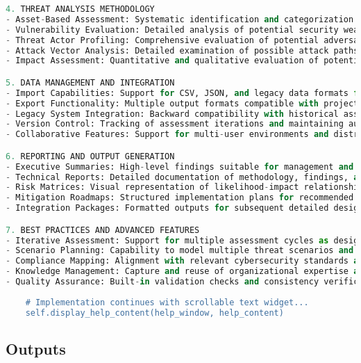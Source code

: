 \documentclass[binding=0.6cm]{sapthesis}
\begin{document}
\begin{lstlisting}[language=Python, caption=Phase 0/A Tool Enhanced Interface Layout]
4. THREAT ANALYSIS METHODOLOGY
- Asset-Based Assessment: Systematic identification and categorization of all mission-critical assets
- Vulnerability Evaluation: Detailed analysis of potential security weaknesses in system design
- Threat Actor Profiling: Comprehensive evaluation of potential adversaries and their capabilities
- Attack Vector Analysis: Detailed examination of possible attack paths and exploitation scenarios
- Impact Assessment: Quantitative and qualitative evaluation of potential consequences

5. DATA MANAGEMENT AND INTEGRATION
- Import Capabilities: Support for CSV, JSON, and legacy data formats from previous assessments
- Export Functionality: Multiple output formats compatible with project management and reporting systems
- Legacy System Integration: Backward compatibility with historical assessment methodologies
- Version Control: Tracking of assessment iterations and maintaining audit trails
- Collaborative Features: Support for multi-user environments and distributed assessment teams

6. REPORTING AND OUTPUT GENERATION
- Executive Summaries: High-level findings suitable for management and stakeholder communication
- Technical Reports: Detailed documentation of methodology, findings, and technical recommendations
- Risk Matrices: Visual representation of likelihood-impact relationships for identified risks
- Mitigation Roadmaps: Structured implementation plans for recommended security controls
- Integration Packages: Formatted outputs for subsequent detailed design phase assessments

7. BEST PRACTICES AND ADVANCED FEATURES
- Iterative Assessment: Support for multiple assessment cycles as design evolves
- Scenario Planning: Capability to model multiple threat scenarios and operational conditions
- Compliance Mapping: Alignment with relevant cybersecurity standards and regulatory requirements
- Knowledge Management: Capture and reuse of organizational expertise and lessons learned
- Quality Assurance: Built-in validation checks and consistency verification for assessment data"""
    
    # Implementation continues with scrollable text widget...
    self.display_help_content(help_window, help_content)
\end{lstlisting}

\subsection{Outputs}
\end{document}

